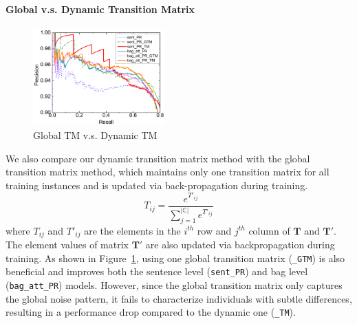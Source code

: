 \paragraph{Global v.s. Dynamic Transition Matrix}
\begin{figure}[htbp]
\setlength{\abovecaptionskip}{3pt}
\begin{center}
\includegraphics[width=0.45\textwidth]{figures/single_cmp_exp_overall.pdf}
\caption{Global TM v.s. Dynamic TM}
\label{fig: cmp_single_dynamic}
\end{center}
\end{figure}
We also compare our dynamic transition matrix method with the global transition matrix method, 
which maintains only one transition matrix for all training instances %
and is updated via back-propagation during training. 
\begin{equation}
\label{shared_mat}
T_{ij} = \frac{e^{T'_{ij}}}{\sum_{j=1}^{|\mathbb{C}|}{e^{T'_{ij}}}}
\end{equation}
where $T_{ij}$ and $T'_{ij}$ are the elements in the $i^{th}$ row and $j^{th}$ column of $\mathbf{T}$ and $\mathbf{T}'$. The element values of matrix $\mathbf{T}'$ are also updated via backpropagation during training.
As shown in Figure~\ref{fig: cmp_single_dynamic}, 
using one global transition matrix (\texttt{\_GTM}) is also beneficial and improves both the sentence level (\texttt{sent\_PR}) and bag level  (\texttt{bag\_att\_PR}) models. However, since the global transition matrix only 
captures the global noise pattern, it fails to characterize individuals with subtle differences, 
resulting in a performance drop compared to the dynamic one (\texttt{\_TM}).



